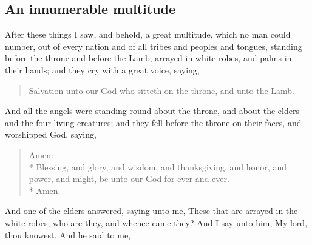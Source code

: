 \subsection*{An innumerable multitude}
After these things I saw, and behold, a great multitude, which no man could number, out of every nation and of all tribes and peoples and tongues, standing before the throne and before the Lamb, arrayed in white robes, and palms in their hands; %
and they cry with a great voice, saying,
\begin{verse}
Salvation unto our God who sitteth on the throne, and unto the Lamb.
\end{verse}
And all the angels were standing round about the throne, and about the elders and the four living creatures; and they fell before the throne on their faces, and worshipped God, %
saying,
\begin{verse}
Amen:\\* Blessing, and glory, and wisdom, and thanksgiving, and honor, and power, and might, be unto our God for ever and ever.\\* Amen.
\end{verse}
And one of the elders answered, saying unto me, These that are arrayed in the white robes, who are they, and whence came they? %
And I say unto him, My lord, thou knowest.%
 And he said to me, 
